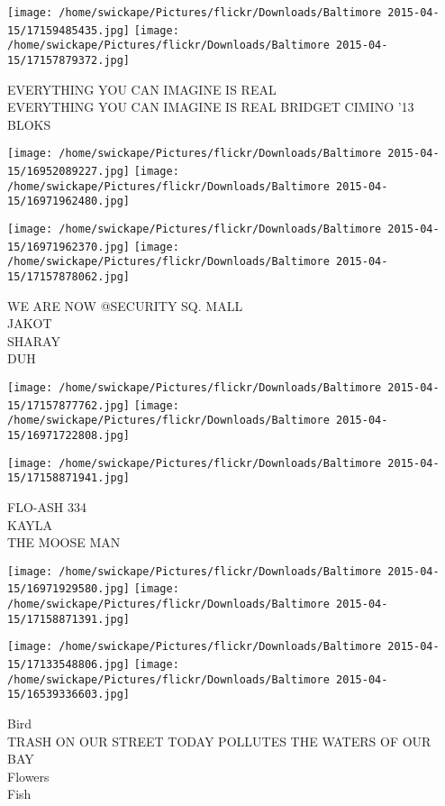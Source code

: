 \documentclass[10pt,letterpaper]{article}
\begin{document}
\vspace{0.25in}
\texttt{[image: /home/swickape/Pictures/flickr/Downloads/Baltimore 2015-04-15/17159485435.jpg]}
\texttt{[image: /home/swickape/Pictures/flickr/Downloads/Baltimore 2015-04-15/17157879372.jpg]}

EVERYTHING YOU CAN IMAGINE IS REAL\\
EVERYTHING YOU CAN IMAGINE IS REAL BRIDGET CIMINO '13\\
BLOKS
\pagebreak

\texttt{[image: /home/swickape/Pictures/flickr/Downloads/Baltimore 2015-04-15/16952089227.jpg]}
\texttt{[image: /home/swickape/Pictures/flickr/Downloads/Baltimore 2015-04-15/16971962480.jpg]}

\texttt{[image: /home/swickape/Pictures/flickr/Downloads/Baltimore 2015-04-15/16971962370.jpg]}
\texttt{[image: /home/swickape/Pictures/flickr/Downloads/Baltimore 2015-04-15/17157878062.jpg]}

WE ARE NOW @SECURITY SQ. MALL\\
JAKOT\\
SHARAY\\
DUH
\pagebreak

\texttt{[image: /home/swickape/Pictures/flickr/Downloads/Baltimore 2015-04-15/17157877762.jpg]}
\texttt{[image: /home/swickape/Pictures/flickr/Downloads/Baltimore 2015-04-15/16971722808.jpg]}

\vspace{0.25in}
\texttt{[image: /home/swickape/Pictures/flickr/Downloads/Baltimore 2015-04-15/17158871941.jpg]}

FLO{-}ASH 334\\
KAYLA\\
THE MOOSE MAN
\pagebreak

\texttt{[image: /home/swickape/Pictures/flickr/Downloads/Baltimore 2015-04-15/16971929580.jpg]}
\texttt{[image: /home/swickape/Pictures/flickr/Downloads/Baltimore 2015-04-15/17158871391.jpg]}

\texttt{[image: /home/swickape/Pictures/flickr/Downloads/Baltimore 2015-04-15/17133548806.jpg]}
\texttt{[image: /home/swickape/Pictures/flickr/Downloads/Baltimore 2015-04-15/16539336603.jpg]}

Bird\\
TRASH ON OUR STREET TODAY POLLUTES THE WATERS OF OUR BAY\\
Flowers\\
Fish
\pagebreak
\end{document}
